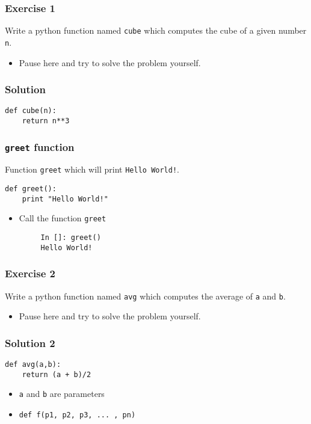 \documentclass[presentation]{beamer}
\begin{document}
\begin{frame}
\frametitle{Exercise 1}
\label{sec-5}


  Write a python function named \texttt{cube} which computes the cube of a given
  number \texttt{n}.
  
\begin{itemize}
\item Pause here and try to solve the problem yourself.
\end{itemize}
\end{frame}
\begin{frame}[fragile]
\frametitle{Solution}
\label{sec-6}

\begin{verbatim}
def cube(n):
    return n**3
\end{verbatim}
\end{frame}
\begin{frame}[fragile]
\frametitle{\texttt{greet} function}
\label{sec-7}


 Function \texttt{greet} which will print \texttt{Hello World!}.
\begin{verbatim}
def greet():
    print "Hello World!"
\end{verbatim}
\begin{itemize}
\item Call the function \texttt{greet}
\begin{verbatim}
     In []: greet()
     Hello World!
\end{verbatim}

\end{itemize}
\end{frame}
\begin{frame}
\frametitle{Exercise 2}
\label{sec-8}


  Write a python function named \texttt{avg} which computes the average of
  \texttt{a} and \texttt{b}.

\begin{itemize}
\item Pause here and try to solve the problem yourself.
\end{itemize}
\end{frame}
\begin{frame}[fragile]
\frametitle{Solution 2}
\label{sec-9}

\begin{verbatim}
def avg(a,b):
    return (a + b)/2
\end{verbatim}

\begin{itemize}
\item \texttt{a} and \texttt{b} are parameters
\item \texttt{def f(p1, p2, p3, ... , pn)}
\end{itemize}
\end{frame}
\end{document}
